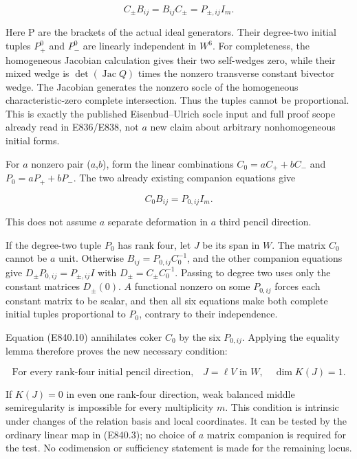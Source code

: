 \[
 C_\pm B_{ij}=B_{ij}C_\pm=P_{\pm,ij}I_m.
 \tag{E840.9}
\]

Here P are the brackets of the actual ideal generators. Their degree-two
initial tuples \(P_+^0\) and \(P_-^0\) are linearly independent in
\(W^6\). For completeness, the homogeneous Jacobian calculation gives
their two self-wedges zero, while their mixed wedge is
\(\det(\operatorname{Jac}Q)\) times the nonzero transverse constant
bivector wedge. The Jacobian generates the nonzero socle of the
homogeneous characteristic-zero complete intersection. Thus the tuples
cannot be proportional. This is exactly the published Eisenbud--Ulrich
socle input and full proof scope already read in E836/E838, not \(a\)
new claim about arbitrary nonhomogeneous initial forms.

For \(a\) nonzero pair (\(a\),\(b\)), form the linear combinations
\(C_0=aC_++bC_-\) and \(P_0=aP_++bP_-\). The two already existing
companion equations give

\[
                         C_0B_{ij}=P_{0,ij}I_m.
 \tag{E840.10}
\]

This does not assume \(a\) separate deformation in \(a\) third pencil
direction.

If the degree-two tuple \(P_0\) has rank four, let \(J\) be its span in
\(W\). The matrix \(C_0\) cannot be \(a\) unit. Otherwise
\(B_{ij}=P_{0,ij}C_0^{-1}\), and the other companion equations give
\(D_\pm P_{0,ij}=P_{\pm,ij}I\) with \(D_\pm=C_\pm C_0^{-1}\). Passing to
degree two uses only the constant matrices \(D_\pm(0)\). \(A\)
functional nonzero on some \(P_{0,ij}\) forces each constant matrix to
be scalar, and then all six equations make both complete initial tuples
proportional to \(P_0\), contrary to their independence.

Equation (E840.10) annihilates coker \(C_0\) by the six \(P_{0,ij}\).
Applying the equality lemma therefore proves the new necessary
condition:

\[
 \boxed{\text{For every rank-four initial pencil direction,}
        \quad J=\ell V\text{ in }W,
        \quad\dim K(J)=1.}
 \tag{E840.11}
\]

If \(K(J)=0\) in even one rank-four direction, weak balanced middle
semiregularity is impossible for every multiplicity \(m\). This
condition is intrinsic under changes of the relation basis and local
coordinates. It can be tested by the ordinary linear map in (E840.3); no
choice of \(a\) matrix companion is required for the test. No
codimension or sufficiency statement is made for the remaining locus.

